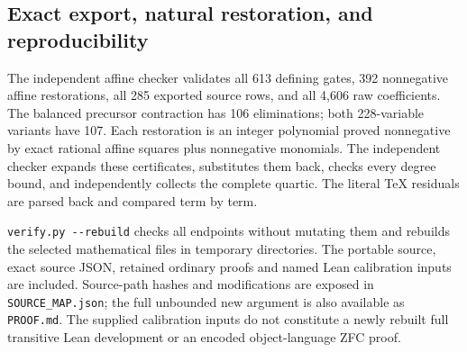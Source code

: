 \subsection{Exact export, natural restoration, and reproducibility}
The independent affine checker validates all 613 defining gates,
392 nonnegative affine restorations, all 285 exported source rows,
and all 4,606 raw coefficients. The balanced precursor contraction has 106
eliminations; both 228-variable variants have 107. Each restoration
is an integer polynomial proved nonnegative by exact rational affine
squares plus nonnegative monomials. The independent checker expands
these certificates, substitutes them back, checks every degree bound,
and independently collects the complete quartic. The literal TeX
residuals are parsed back and compared term by term.

\texttt{verify.py -{}-rebuild} checks all endpoints without mutating them
and rebuilds the selected mathematical files in temporary directories.
The portable source, exact source JSON, retained ordinary proofs and
named Lean calibration inputs are included. Source-path hashes and
modifications are exposed in \texttt{SOURCE\_MAP.json}; the full
unbounded new argument is also available as \texttt{PROOF.md}.
The supplied calibration inputs do not constitute a newly rebuilt full
transitive Lean development or an encoded object-language ZFC proof.
